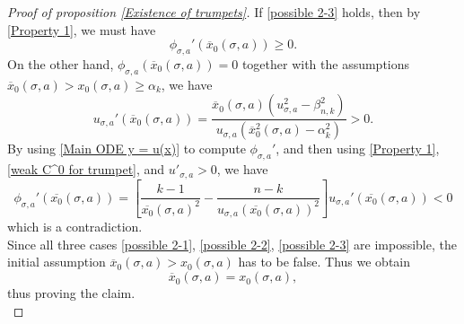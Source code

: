 \documentclass[pdflatex,sn-mathphys-num]{sn-jnl}
\begin{document}
\begin{proof}[Proof of proposition \ref{Existence of trumpets}]
    If \eqref{possible 2-3} holds, then by \eqref{Property 1}, we must have
    \begin{equation}
        \phi_{\sigma, a}'(\overline{x}_0(\sigma, a)) \geq 0.
    \end{equation}
    On the other hand, $\phi_{\sigma, a}(\overline{x}_0(\sigma, a)) = 0$ together with the assumptions $\overline{x}_0(\sigma, a) > x_0(\sigma, a) \geq \alpha_k$, we have
    $$u_{\sigma, a}'(\overline{x}_0(\sigma, a)) = \frac{\overline{x}_0(\sigma, a)(u^2_{\sigma, a} - \beta_{n,k}^2)}{u_{\sigma, a}(\overline{x}_0^2(\sigma, a) - \alpha_k^2)}> 0.$$
    By using \eqref{Main ODE y = u(x)} to compute $\phi_{\sigma, a}'$, and then using \eqref{Property 1}, \eqref{weak C^0 for trumpet}, and $u'_{\sigma, a} >0$, we have
\begin{equation}
    \phi_{\sigma, a}'(\overline{x_0}(\sigma, a)) = [\frac{k-1}{\overline{x_0}(\sigma, a)^2} - \frac{n - k}{u_{\sigma, a}(\overline{x_0}(\sigma, a))^2}]u_{\sigma, a}'(\overline{x_0}(\sigma, a)) < 0
\end{equation}
    which is a contradiction. \\
    
    Since all three cases \eqref{possible 2-1}, \eqref{possible 2-2}, \eqref{possible 2-3} are impossible, the initial assumption $\overline{x}_0(\sigma, a) > x_0(\sigma, a)$ has to be  false. Thus we obtain
 \begin{equation}
     \overline{x}_0(\sigma, a) =x_0(\sigma, a),
 \end{equation}
    thus proving the claim.\\


\end{proof}
\end{document}
